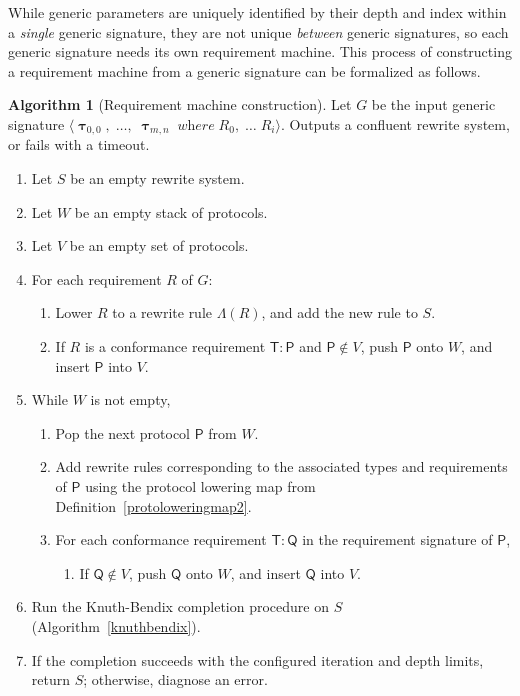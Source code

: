 \documentclass[a4paper,headsepline,bibliography=totoc,toc=flat,fleqn,twoside=semi]{scrbook}
\theoremstyle{definition}
\theoremstyle{definition}
\theoremstyle{definition}
\newtheorem{algorithm}{Algorithm}[chapter]
\newcommand{\namesym}[1]{\mathsf{#1}}
\newcommand{\proto}[1]{\bm{\mathsf{#1}}}
\newcommand{\gensig}[2]{\langle #1\;\textit{where}\;#2\rangle}
\newcommand{\genericsym}[2]{\bm{\uptau}_{#1,#2}}
\begin{document}
While generic parameters are uniquely identified by their depth and index within a \emph{single} generic signature, they are not unique \emph{between} generic signatures, so each generic signature needs its own requirement machine. This process of constructing a requirement machine from a generic signature can be formalized as follows.
\begin{algorithm}[Requirement machine construction]\label{rqmalgo}
Let $G$ be the input generic signature $\gensig{\genericsym{0}{0},\;\ldots,\;\genericsym{m}{n}}{R_0,\;\ldots\;R_i}$. Outputs a confluent rewrite system, or fails with a timeout.
\begin{enumerate}
\item Let $S$ be an empty rewrite system.
\item Let $W$ be an empty stack of protocols.
\item Let $V$ be an empty set of protocols.
\item For each requirement $R$ of $G$:
\begin{enumerate}
\item Lower $R$ to a rewrite rule $\Lambda(R)$, and add the new rule to $S$. 
\item If $R$ is a conformance requirement $\namesym{T}\colon\proto{P}$ and $\proto{P}\notin V$, push $\proto{P}$ onto $W$, and insert $\proto{P}$ into $V$.
\end{enumerate}
\item While $W$ is not empty,
\begin{enumerate}
\item Pop the next protocol $\proto{P}$ from $W$.
\item Add rewrite rules corresponding to the associated types and requirements of $\proto{P}$ using the protocol lowering map from Definition~\ref{protoloweringmap2}. 
\item For each conformance requirement $\namesym{T}\colon\proto{Q}$ in the requirement signature of $\proto{P}$,
\begin{enumerate}
\item If $\proto{Q}\notin V$, push $\proto{Q}$ onto $W$, and insert $\proto{Q}$ into $V$.
\end{enumerate}
\end{enumerate}
\item Run the Knuth-Bendix completion procedure on $S$ (Algorithm~\ref{knuthbendix}).
\item If the completion succeeds with the configured iteration and depth limits, return $S$; otherwise, diagnose an error.
\end{enumerate}
\end{algorithm}
\end{document}
